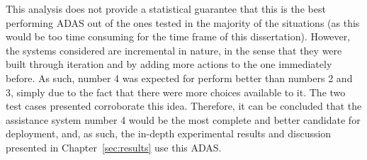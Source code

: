This analysis does not provide a statistical guarantee that this is the best performing ADAS out of the ones tested in the majority of the situations (as this would be too time consuming for the time frame of this dissertation). However, the systems considered are incremental in nature, in the sense that they were built through iteration and by adding more actions to the one immediately before. As such, number 4 was expected for perform better than numbers 2 and 3, simply due to the fact that there were more choices available to it. The two test cases presented corroborate this idea. Therefore, it can be concluded that the assistance system number 4 would be the most complete and better candidate for deployment, and, as such, the in-depth experimental results and discussion presented in Chapter~\ref{sec:results} use this ADAS.

